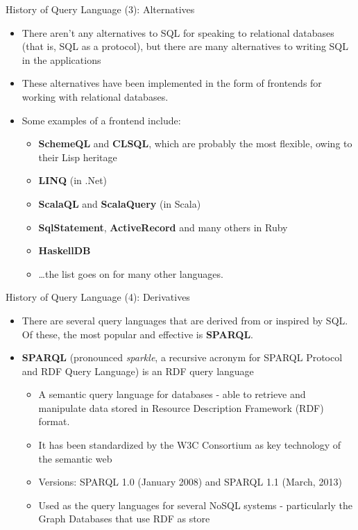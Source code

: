 \documentclass[aspectratio=169, xcolor=dvipsnames]{beamer}
\begin{document}
\begin{frame}{History of Query Language (3): Alternatives}
    \begin{itemize}[<+->]
        \item There aren't any alternatives to SQL for speaking to relational databases (that is, SQL as a protocol), but there are many alternatives to writing SQL in the applications
        \item These alternatives have been implemented in the form of frontends for working with relational databases.
        \item Some examples of a frontend include:
        \begin{itemize}
            \item \textbf{SchemeQL} and \textbf{CLSQL}, which are probably the most flexible, owing to their Lisp heritage
            \item \textbf{LINQ} (in .Net)
            \item \textbf{ScalaQL} and \textbf{ScalaQuery} (in Scala)
            \item \textbf{SqlStatement}, \textbf{ActiveRecord} and many others in Ruby
            \item \textbf{HaskellDB}
            \item \dots the list goes on for many other languages.
        \end{itemize}
    \end{itemize}
\end{frame}

\begin{frame}{History of Query Language (4): Derivatives}
    \begin{itemize}[<+->]
        \item There are several query languages that are derived from or inspired by SQL. Of these, the most popular and effective is \textbf{SPARQL}.
        \item \textbf{SPARQL} (pronounced \textit{sparkle}, a recursive acronym for SPARQL Protocol and RDF Query Language) is an RDF query language
        \begin{itemize}
            \item[$\triangleright$] A semantic query language for databases - able to retrieve and manipulate data stored in Resource Description Framework (RDF) format.
            \item[$\triangleright$] It has been standardized by the W3C Consortium as key technology of the semantic web
            \item[$\triangleright$] Versions: SPARQL 1.0 (January 2008) and SPARQL 1.1 (March, 2013)
            \item[$\triangleright$] Used as the query languages for several NoSQL systems - particularly the Graph Databases that use RDF as store
        \end{itemize}
    \end{itemize}
\end{frame}
\end{document}
